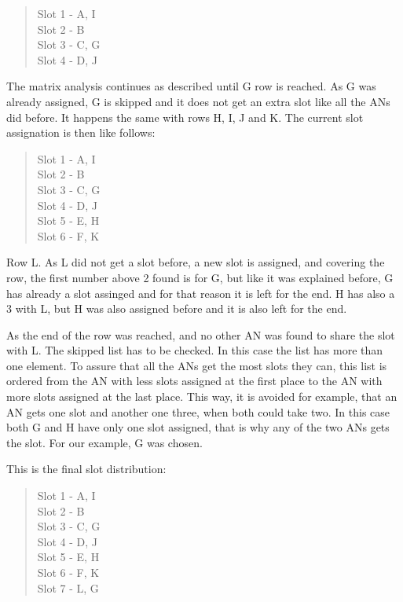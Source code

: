 \begin{itemize}
 \begin{quote}
  Slot 1 - A, I \\ Slot 2 - B \\ Slot 3 - C, G \\ Slot 4 - D, J
 \end{quote}
The matrix analysis continues as described until G row is reached. As G was already assigned, G is skipped and it does not get an extra 
slot like all the \acp{AN} did before. It happens the same with rows H, I, J and K. The current slot assignation is then like follows:
 \begin{quote}
  Slot 1 - A, I \\ Slot 2 - B \\ Slot 3 - C, G \\ Slot 4 - D, J \\ Slot 5 - E, H \\ Slot 6 - F, K
 \end{quote}
Row L. As L did not get a slot before, a new slot is assigned, and covering the row, the first number above 2 found is for G, but
like it was explained before, G has already a slot assinged and for that reason it is left for the end. H has also a 3 with L, but H 
was also assigned before and it is also left for the end.

As the end of the row was reached, and no other \ac{AN} was found to share the slot with L. The skipped list has to be checked. In this case 
the list has more than one element. To assure that all the \acp{AN} get the most slots they can, this list is ordered from the \ac{AN} with 
less slots assigned at the first place to the \ac{AN} with more slots assigned at the last place. This way, it is avoided for example, that 
an \ac{AN} gets one slot and another one three, when both could take two. In this case both G and H have only one slot assigned, that is why any 
of the two \acp{AN} gets the slot. For our example, G was chosen.

This is the final slot distribution:
 \begin{quote}
  Slot 1 - A, I \\ Slot 2 - B \\ Slot 3 - C, G \\ Slot 4 - D, J \\ Slot 5 - E, H \\ Slot 6 - F, K \\ Slot 7 - L, G
 \end{quote}
\end{itemize}

